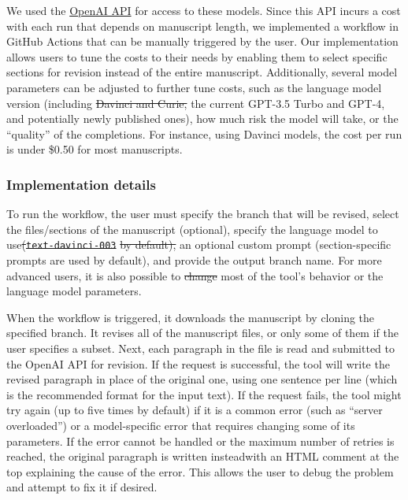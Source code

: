 \documentclass[
]{article}
\providecommand{\DIFaddtex}[1]{{\protect\color{blue}\uwave{#1}}} %
\providecommand{\DIFdeltex}[1]{{\protect\color{red}\sout{#1}}}                      %
\providecommand{\DIFaddbegin}{} %
\providecommand{\DIFaddend}{} %
\providecommand{\DIFdelbegin}{} %
\providecommand{\DIFdelend}{} %
\providecommand{\DIFadd}[1]{\texorpdfstring{\DIFaddtex{#1}}{#1}} %
\providecommand{\DIFdel}[1]{\texorpdfstring{\DIFdeltex{#1}}{}} %
\newcommand{\DIFscaledelfig}{0.5}
\newlength{\DIFdelgraphicswidth} %
\newlength{\DIFdelgraphicsheight} %
\newcommand{\DIFaddincludegraphics}[2][]{{\color{blue}\fbox{\DIFOincludegraphics[#1]{#2}}}} %
\newcommand{\DIFdelincludegraphics}[2][]{%
\sbox{\DIFdelgraphicsbox}{\DIFOincludegraphics[#1]{#2}}%
\settoboxwidth{\DIFdelgraphicswidth}{\DIFdelgraphicsbox} %
\settoboxtotalheight{\DIFdelgraphicsheight}{\DIFdelgraphicsbox} %
\scalebox{\DIFscaledelfig}{%
\parbox[b]{\DIFdelgraphicswidth}{\usebox{\DIFdelgraphicsbox}\\[-\baselineskip] \rule{\DIFdelgraphicswidth}{0em}}\llap{\resizebox{\DIFdelgraphicswidth}{\DIFdelgraphicsheight}{%
\setlength{\unitlength}{\DIFdelgraphicswidth}%
\begin{picture}(1,1)%
\thicklines\linethickness{2pt} %
{\color[rgb]{1,0,0}\put(0,0){\framebox(1,1){}}}%
{\color[rgb]{1,0,0}\put(0,0){\line( 1,1){1}}}%
{\color[rgb]{1,0,0}\put(0,1){\line(1,-1){1}}}%
\end{picture}%
}\hspace*{3pt}}} %
} %
\DeclareRobustCommand{\DIFaddbegin}{\DIFOaddbegin \let\includegraphics\DIFaddincludegraphics} %
\DeclareRobustCommand{\DIFaddend}{\DIFOaddend \let\includegraphics\DIFOincludegraphics} %
\DeclareRobustCommand{\DIFdelbegin}{\DIFOdelbegin \let\includegraphics\DIFdelincludegraphics} %
\DeclareRobustCommand{\DIFdelend}{\DIFOaddend \let\includegraphics\DIFOincludegraphics} %
\begin{document}
We used the \href{https://openai.com/api/}{OpenAI API} for access to these models.
Since this API incurs a cost with each run that depends on \DIFaddbegin \DIFadd{the }\DIFaddend manuscript length, we implemented a workflow in GitHub Actions that can be manually triggered by the user.
Our implementation allows users to tune the costs to their needs by enabling them to select specific sections for revision instead of the entire manuscript.
Additionally, several model parameters can be adjusted to further tune costs, such as the language model version (including \DIFdelbegin \DIFdel{Davinci and Curie, }\DIFdelend the current GPT-3.5 Turbo and GPT-4, and potentially newly published ones), how much risk the model will take, or the ``quality'' of the completions.
For instance, using Davinci models, the cost per run is under \$0.50 for most manuscripts.

\subsubsection{Implementation details}

To run the workflow, the user must specify the branch that will be revised, select the files/sections of the manuscript (optional), specify the language model to use\DIFdelbegin \DIFdel{(}\texttt{\DIFdel{text-davinci-003}} %
\DIFdel{by default), }\DIFdelend \DIFaddbegin \DIFadd{, provide }\DIFaddend an optional custom prompt (section-specific prompts are used by default), and provide the output branch name.
For more advanced users, it is also possible to \DIFdelbegin \DIFdel{change }\DIFdelend \DIFaddbegin \DIFadd{modify }\DIFaddend most of the tool's behavior or the language model parameters.

When the workflow is triggered, it downloads the manuscript by cloning the specified branch.
It revises all of the manuscript files, or only some of them if the user specifies a subset.
Next, each paragraph in the file is read and submitted to the OpenAI API for revision.
If the request is successful, the tool will write the revised paragraph in place of the original one, using one sentence per line (which is the recommended format for the input text).
If the request fails, the tool might try again (up to five times by default) if it is a common error (such as ``server overloaded'') or a model-specific error that requires changing some of its parameters.
If the error cannot be handled or the maximum number of retries is reached, the original paragraph is written instead\DIFaddbegin \DIFadd{, }\DIFaddend with an HTML comment at the top explaining the cause of the error.
This allows the user to debug the problem and attempt to fix it if desired.
\end{document}
